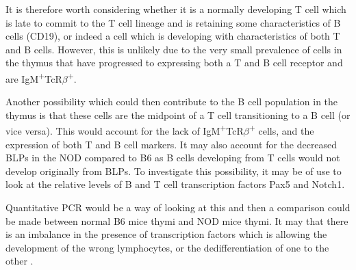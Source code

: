 It is therefore worth considering whether it is a normally developing T cell which is late to commit to the T cell lineage and is retaining some characteristics of B cells (CD19), or indeed a cell which is developing with characteristics of both T and B cells.
However, this is unlikely due to the very small prevalence of cells in the thymus that have progressed to expressing both a T and B cell receptor and are IgM\textsuperscript{+}TcR$\beta$\textsuperscript{+}.

Another possibility which could then contribute to the B cell population in the thymus is that these cells are the midpoint of a T cell transitioning to a B cell (or vice versa).
This would account for the lack of IgM\textsuperscript{+}TcR$\beta$\textsuperscript{+} cells, and the expression of both T and B cell markers.
It may also account for the decreased BLPs in the NOD compared to B6 as B cells developing from T cells would not develop originally from BLPs.
To investigate this possibility, it may be of use to look at the relative levels of B and T cell transcription factors Pax5 and Notch1.

Quantitative PCR would be a way of looking at this and then a comparison could be made between normal B6 mice thymi and NOD mice thymi.
It may that there is an imbalance in the presence of transcription factors which is allowing the development of the wrong lymphocytes, or the dedifferentiation of one to the other \citep{Cobaleda2007}.

